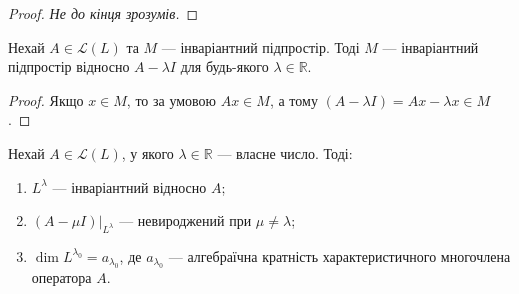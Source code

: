 \documentclass{math_library}
\begin{document}
\begin{proof}
\textit{Не до кінця зрозумів.}
\end{proof}
\fi

\begin{lemma}
Нехай $A \in \mathcal{L}(L)$ та $M$ --- інваріантний підпростір. Тоді $M$ --- інваріантний підпростір відносно $A-\lambda I$ для будь-якого $\lambda \in \mathbb{R}$.
\end{lemma}

\begin{proof}
Якщо $x \in M$, то за умовою $Ax \in M$, а тому $(A-\lambda I) = Ax - \lambda x \in M$.
\end{proof}

\begin{proposition}
Нехай $A \in \mathcal{L}(L)$, у якого $\lambda \in \mathbb{R}$ --- власне число. Тоді:
\begin{enumerate}[nosep,wide=0pt,label={\arabic*)}]
\item $L^\lambda$ --- інваріантний відносно $A$;
\item $(A-\mu I)|_{L^\lambda}$ --- невироджений при $\mu \neq \lambda$;
\item $\dim L^{\lambda_0} = a_{\lambda_0}$, де $a_{\lambda_0}$ --- алгебраїчна кратність характеристичного многочлена оператора $A$.
\end{enumerate}
\end{proposition}
\end{document}
